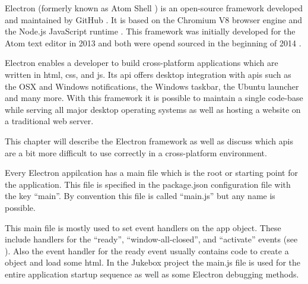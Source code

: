 

Electron (formerly known as Atom Shell \cite{atomShell}) is an open-source framework developed and maintained by GitHub \cite{electron}. It is based on the Chromium V8 browser engine \cite{chromium} and the Node.js JavaScript runtime \cite{nodejs}. This framework was initially developed for the Atom text editor \cite{atom} in 2013 and both were opend sourced in the beginning of 2014 \cite{aboutElectron}.

Electron enables a developer to build cross-platform applications which are written in \gls{html}, \gls{css}, and \gls{js}. Its \gls{api} offers desktop integration with \gls{api}s such as the OSX and Windows notifications, the Windows taskbar, the Ubuntu launcher and many more. With this framework it is possible to maintain a single code-base while serving all major desktop operating systems as well as hosting a website on a traditional web server.

This chapter will describe the Electron framework as well as discuss which \gls{api}s are a bit more difficult to use correctly in a cross-platform environment.


Every Electron appilcation has a main file which is the root or starting point for the application. This file is specified in the package.json configuration file with the key \enquote{main}. By convention this file is called \enquote{main.js} but any name is possible.


This main file is mostly used to set event handlers on the app object. These include handlers for the \enquote{ready}, \enquote{window-all-closed}, and \enquote{activate} events (see ). Also the event handler for the ready event usually contains code to create a  object and load some \gls{html}. In the Jukebox project the main.js file is used for the entire application startup sequence as well as some Electron debugging methods.





